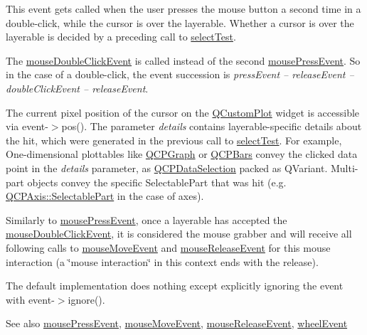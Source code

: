 This event gets called when the user presses the mouse button a second time in a double-\/click, while the cursor is over the layerable. Whether a cursor is over the layerable is decided by a preceding call to \hyperlink{classQCPLayerable_a04db8351fefd44cfdb77958e75c6288e}{select\+Test}.

The \hyperlink{classQCPLayerable_a4171e2e823aca242dd0279f00ed2de81}{mouse\+Double\+Click\+Event} is called instead of the second \hyperlink{classQCPLayerable_af6567604818db90f4fd52822f8bc8376}{mouse\+Press\+Event}. So in the case of a double-\/click, the event succession is {\itshape press\+Event -- release\+Event -- double\+Click\+Event -- release\+Event}.

The current pixel position of the cursor on the \hyperlink{classQCustomPlot}{Q\+Custom\+Plot} widget is accessible via {\ttfamily event-\/$>$pos()}. The parameter {\itshape details} contains layerable-\/specific details about the hit, which were generated in the previous call to \hyperlink{classQCPLayerable_a04db8351fefd44cfdb77958e75c6288e}{select\+Test}. For example, One-\/dimensional plottables like \hyperlink{classQCPGraph}{Q\+C\+P\+Graph} or \hyperlink{classQCPBars}{Q\+C\+P\+Bars} convey the clicked data point in the {\itshape details} parameter, as \hyperlink{classQCPDataSelection}{Q\+C\+P\+Data\+Selection} packed as Q\+Variant. Multi-\/part objects convey the specific {\ttfamily Selectable\+Part} that was hit (e.\+g. \hyperlink{classQCPAxis_abee4c7a54c468b1385dfce2c898b115f}{Q\+C\+P\+Axis\+::\+Selectable\+Part} in the case of axes).

Similarly to \hyperlink{classQCPLayerable_af6567604818db90f4fd52822f8bc8376}{mouse\+Press\+Event}, once a layerable has accepted the \hyperlink{classQCPLayerable_a4171e2e823aca242dd0279f00ed2de81}{mouse\+Double\+Click\+Event}, it is considered the mouse grabber and will receive all following calls to \hyperlink{classQCPLayerable_a9eee1ba47fd69be111059ca3881933e4}{mouse\+Move\+Event} and \hyperlink{classQCPLayerable_aa0d79b005686f668622bbe66ac03ba2c}{mouse\+Release\+Event} for this mouse interaction (a \char`\"{}mouse interaction\char`\"{} in this context ends with the release).

The default implementation does nothing except explicitly ignoring the event with {\ttfamily event-\/$>$ignore()}.

\begin{DoxySeeAlso}{See also}
\hyperlink{classQCPLayerable_af6567604818db90f4fd52822f8bc8376}{mouse\+Press\+Event}, \hyperlink{classQCPLayerable_a9eee1ba47fd69be111059ca3881933e4}{mouse\+Move\+Event}, \hyperlink{classQCPLayerable_aa0d79b005686f668622bbe66ac03ba2c}{mouse\+Release\+Event}, \hyperlink{classQCPLayerable_a47dfd7b8fd99c08ca54e09c362b6f022}{wheel\+Event} 
\end{DoxySeeAlso}


